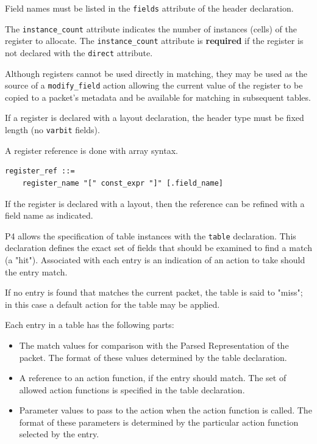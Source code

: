 \documentclass[12pt]{article}
\begin{document}
Field names must be listed in the \texttt{fields} attribute of the 
header declaration. 

The \texttt{instance_count} attribute indicates the number of 
instances (cells) of the register to allocate. The 
\texttt{instance_count} attribute is \textbf{required} if the 
register is not declared with the \texttt{direct} attribute.

Although registers cannot be used directly in matching, they may be used as 
the source of a \texttt{modify_field} action allowing the current value 
of the register to be copied to a packet's metadata and be available 
for matching in subsequent tables.

If a register is declared with a layout declaration, the header type must 
be fixed length (no \texttt{varbit} fields).

A register reference is done with array syntax.

\begin{lstlisting}[style=BNFstyle]
register_ref ::=
    register_name "[" const_expr "]" [.field_name]
\end{lstlisting}


If the register is declared with a layout, then the reference can be refined 
with a field name as indicated.



P4 allows the specification of table instances with the \texttt{table}
declaration. This declaration defines the exact set of fields that
should be examined to find a match (a "hit").  Associated with each
entry is an indication of an action to take should the entry match.

If no entry is found that matches the current packet, the table is said to 
"miss"; in this case a default action for the table may be applied.

Each entry in a \matchaction table has the following parts: 

\begin{itemize}
\item
The match values for comparison with the Parsed Representation of the packet. 
The format of these values determined by the table declaration.
\item
A reference to an action function, if the entry should match. The set
of allowed action functions is specified in the table declaration.
\item
Parameter values to pass to the action when the action function is called. 
The format of these parameters is determined by the particular action function 
selected by the entry.
\end{itemize}
\end{document}
